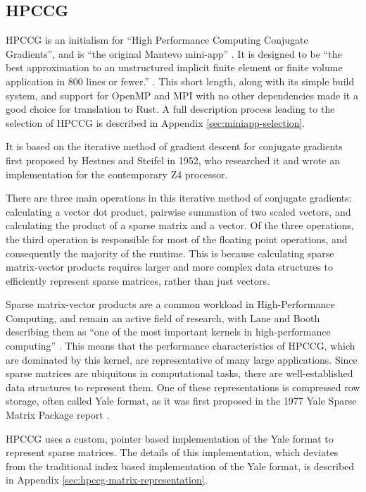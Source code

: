 \subsection{HPCCG}
\label{ssec:hpccg} %

HPCCG is an initialism for ``High Performance Computing Conjugate Gradients'', and is ``the original Mantevo mini-app'' \cite{herouxHPCCGSolverPackage2007}. It is designed to be ``the best approximation to an unstructured implicit finite element or finite volume application in 800 lines or fewer.'' \cite{PackagesMantevo}. This short length, along with its simple build system, and support for OpenMP and MPI with no other dependencies made it a good choice for translation to Rust. A full description process leading to the selection of HPCCG is described in Appendix \ref{sec:miniapp-selection}.

It is based on the iterative method of gradient descent for conjugate gradients first proposed by Hestnes and Steifel in 1952\cite{hestenesMethodsConjugateGradients1952}, who researched it and wrote an implementation for the contemporary Z4 processor.

There are three main operations in this iterative method of conjugate gradients: calculating a vector dot product, pairwise summation of two scaled vectors, and calculating the product of a sparse matrix and a vector. Of the three operations, the third operation is responsible for most of the floating point operations, and consequently the majority of the runtime. This is because calculating sparse matrix-vector products requires larger and more complex data structures to efficiently represent sparse matrices, rather than just vectors.

Sparse matrix-vector products are a common workload in High-Performance Computing, and remain an active field of research, with Lane and Booth describing them as ``one of the most important kernels in high-performance computing'' \cite{laneHeterogeneousSparseMatrixVector2023}. This means that the performance characteristics of HPCCG, which are dominated by this kernel, are representative of many large applications. Since sparse matrices are ubiquitous in computational tasks, there are well-established data structures to represent them. One of these representations is compressed row storage, often called Yale format, as it was first proposed in the 1977 Yale Sparse Matrix Package report \cite{eisenstat1977yale}.

HPCCG uses a custom, pointer based implementation of the Yale format to represent sparse matrices. The details of this implementation, which deviates from the traditional index based implementation of the Yale format, is described in Appendix \ref{sec:hpccg-matrix-representation}.

